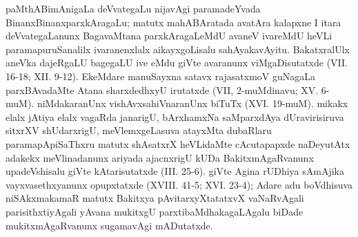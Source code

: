 paMthABimAnigaLa deVvategaLu nijavAgi paramadeYvada BinanxBinanxparxkAragaLu; matutx mahABAratada avatAra kalapxne I itara deVvategaLanunx BagavaMtana parxkAragaLeMdU avaneV ivareMdU heVLi paramapuruSanalilx ivaranenxlalx aikayxgoLisalu sahAyakavAyitu. BakatxralUlx aneVka dajeRgaLU bagegaLU ive eMdu giVte avaranunx viMgaDisutatxde {\rm(VII. 16-18; XII. 9-12)}. EkeMdare manuSayxna satavx rajasatxmoV guNagaLa parxBAvadaMte Atana sharxdedhxyU irutatxde ({\rm VII, 2}-muMdinavu; {\rm XV. 6}-muM). niMdakaranUnx vishAvxsahiVnaranUnx biTuTx ({\rm XVI. 19}-muM). mikakx elalx jAtiya elalx vagaRda janarigU, bArxhamxNa saMparxdAya dUravirisiruva sitxrXV shUdarxrigU, meVlemxgeLasuva atayxMta dubaRlaru paramapApiSaThxru matutx shAsatxrX heVLidaMte cAcutapapxde naDeyutAtx adakekx meVlinadanunx ariyada ajacnxrigU kUDa BakitxmAgaRvanunx upadeVshisalu giVte kAtarisutatxde {\rm(III. 25-6).} giVte Agina rUDhiya sAmAjika vayxvasethxyanunx opupxtatxde {\rm(XVIII. 41-5; XVI. 23-4);} Adare adu boVdhisuva niSAkxmakamaR matutx Bakitxya pAvitarxyXtatatxvX vaNaRvAgali parisithxtiyAgali yAvana mukitxgU parxtibaMdhakagaLAgalu biDade mukitxmAgaRvanunx sugamavAgi mADutatxde.

